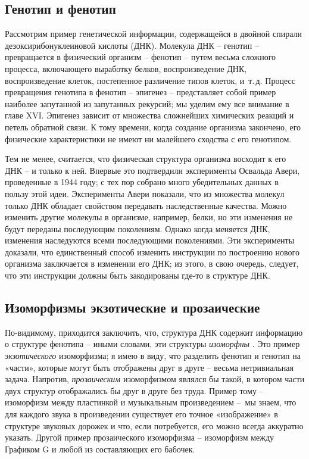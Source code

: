 \documentclass[../main.tex]{subfiles}
\begin{document}
\subsection{Генотип и фенотип}

Рассмотрим пример генетической информации, содержащейся в двойной спирали дезоксирибонуклеиновой кислоты (ДНК). Молекула ДНК \--- генотип \--- превращается в физический организм \--- фенотип \--- путем весьма сложного процесса, включающего выработку белков, воспроизведение ДНК, воспроизведение клеток, постепенное различение типов клеток, и~т.\,д. Процесс превращения генотипа в фенотип \--- эпигенез \--- представляет собой пример наиболее запутанной из запутанных рекурсий; мы уделим ему все внимание в главе XVI. Эпигенез зависит от множества сложнейших химических реакций и петель обратной связи. К тому времени, когда создание организма закончено, его физические характеристики не имеют ни малейшего сходства с его генотипом.

Тем не менее, считается, что физическая структура организма восходит к его ДНК \--- и только к ней. Впервые это подтвердили эксперименты Освальда Авери, проведенные в 1944 году; с тех пор собрано много убедительных данных в пользу этой идеи. Эксперименты Авери показали, что из множества молекул только ДНК обладает свойством передавать наследственные качества. Можно изменить другие молекулы в организме, например, белки, но эти изменения не будут переданы последующим поколениям. Однако когда меняется ДНК, изменения наследуются всеми последующими поколениями. Эти эксперименты доказали, что единственный способ изменить инструкции по построению нового организма заключается в изменении его ДНК; из этого, в свою очередь, следует, что эти инструкции должны быть закодированы где-то в структуре ДНК\@.


\subsection{Изоморфизмы экзотические и прозаические}

По-видимому, приходится заключить, что, структура ДНК содержит информацию о структуре фенотипа \--- иными словами, эти структуры \emph{изоморфны} . Это пример \emph{экзотического} изоморфизма; я имею в виду, что разделить фенотип и генотип на «части», которые могут быть отображены друг в друге \--- весьма нетривиальная задача. Напротив, \emph{прозаическим} изоморфизмом являлся бы такой, в котором части двух структур отображались бы друг в друге без труда. Пример тому \--- изоморфизм между пластинкой и музыкальным произведением \---~мы знаем, что для каждого звука в произведении существует его точное «изображение» в структуре звуковых дорожек и что, если потребуется, его можно всегда аккуратно указать. Другой пример прозаического изоморфизма \--- изоморфизм между Графиком G и любой из составляющих его бабочек.
\end{document}
